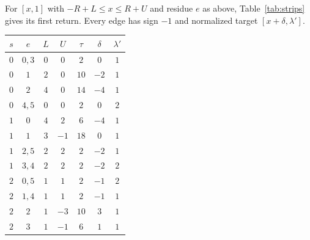 \begin{lemma}\label{lem:strips}
For $[x,1]$ with $-R+L\le x\le R+U$ and residue $e$ as above,
Table~\ref{tab:strips} gives its first return. Every edge has sign
$-1$ and normalized target $[x+\delta,\lambda']$.
\end{lemma}

\begin{center}
\begin{minipage}{\linewidth}
\centering
\begin{tabular}{ccccccc}
\toprule
$s$ & $e$ & $L$ & $U$ & $\tau$ & $\delta$ & $\lambda'$\\
\midrule
$0$ & $0,3$ & $0$ & $0$ & $2$ & $0$ & $1$\\
$0$ & $1$ & $2$ & $0$ & $10$ & $-2$ & $1$\\
$0$ & $2$ & $4$ & $0$ & $14$ & $-4$ & $1$\\
$0$ & $4,5$ & $0$ & $0$ & $2$ & $0$ & $2$\\
\midrule
$1$ & $0$ & $4$ & $2$ & $6$ & $-4$ & $1$\\
$1$ & $1$ & $3$ & $-1$ & $18$ & $0$ & $1$\\
$1$ & $2,5$ & $2$ & $2$ & $2$ & $-2$ & $1$\\
$1$ & $3,4$ & $2$ & $2$ & $2$ & $-2$ & $2$\\
\midrule
$2$ & $0,5$ & $1$ & $1$ & $2$ & $-1$ & $2$\\
$2$ & $1,4$ & $1$ & $1$ & $2$ & $-1$ & $1$\\
$2$ & $2$ & $1$ & $-3$ & $10$ & $3$ & $1$\\
$2$ & $3$ & $1$ & $-1$ & $6$ & $1$ & $1$\\
\bottomrule
\end{tabular}
\label{tab:strips}
\end{minipage}
\end{center}

